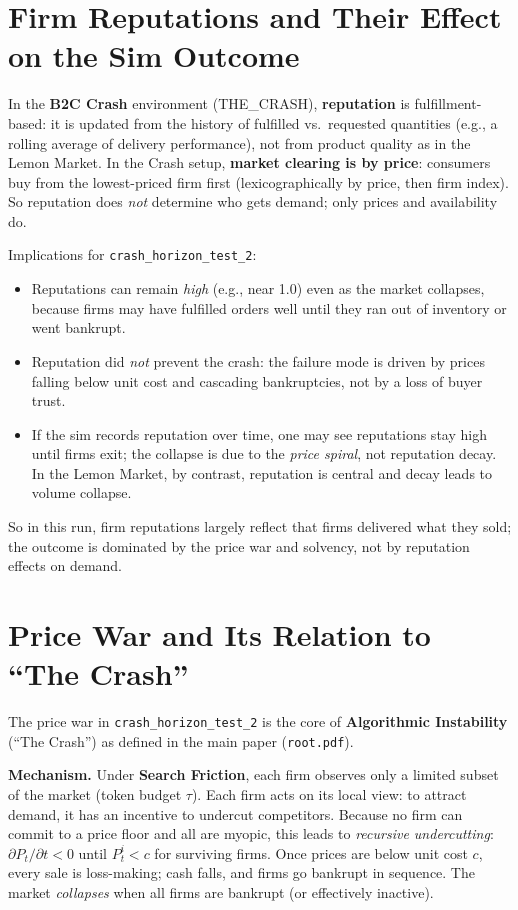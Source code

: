 \documentclass{article}
\begin{document}
\section{Firm Reputations and Their Effect on the Sim Outcome}

In the \textbf{B2C Crash} environment (THE\_CRASH), \textbf{reputation} is fulfillment-based: it is updated from the history of fulfilled vs.\ requested quantities (e.g., a rolling average of delivery performance), not from product quality as in the Lemon Market. In the Crash setup, \textbf{market clearing is by price}: consumers buy from the lowest-priced firm first (lexicographically by price, then firm index). So reputation does \emph{not} determine who gets demand; only prices and availability do.

Implications for \texttt{crash\_horizon\_test\_2}:
\begin{itemize}
    \item Reputations can remain \emph{high} (e.g., near 1.0) even as the market collapses, because firms may have fulfilled orders well until they ran out of inventory or went bankrupt.
    \item Reputation did \emph{not} prevent the crash: the failure mode is driven by prices falling below unit cost and cascading bankruptcies, not by a loss of buyer trust.
    \item If the sim records reputation over time, one may see reputations stay high until firms exit; the collapse is due to the \emph{price spiral}, not reputation decay. In the Lemon Market, by contrast, reputation is central and decay leads to volume collapse.
\end{itemize}

So in this run, firm reputations largely reflect that firms delivered what they sold; the outcome is dominated by the price war and solvency, not by reputation effects on demand.

\section{Price War and Its Relation to ``The Crash''}

The price war in \texttt{crash\_horizon\_test\_2} is the core of \textbf{Algorithmic Instability} (``The Crash'') as defined in the main paper (\texttt{root.pdf}).

\textbf{Mechanism.} Under \textbf{Search Friction}, each firm observes only a limited subset of the market (token budget \(\tau\)). Each firm acts on its local view: to attract demand, it has an incentive to undercut competitors. Because no firm can commit to a price floor and all are myopic, this leads to \emph{recursive undercutting}: \(\partial P_t / \partial t < 0\) until \(P_t^i < c\) for surviving firms. Once prices are below unit cost \(c\), every sale is loss-making; cash falls, and firms go bankrupt in sequence. The market \emph{collapses} when all firms are bankrupt (or effectively inactive).
\end{document}

